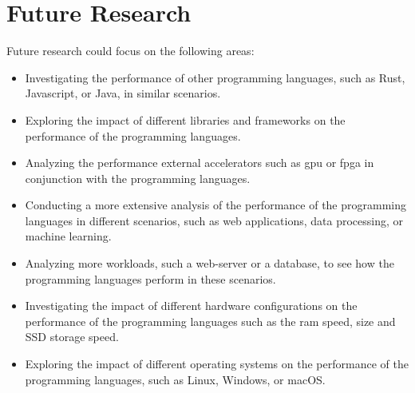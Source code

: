 \section{Future Research}
Future research could focus on the following areas:
\begin{itemize}
    \item Investigating the performance of other programming languages, such as Rust, Javascript, or Java, in similar scenarios.
    \item Exploring the impact of different libraries and frameworks on the performance of the programming languages.
    \item Analyzing the performance external accelerators such as \gls{gpu} or \gls{fpga} in conjunction with the programming languages.
    \item Conducting a more extensive analysis of the performance of the programming languages in different scenarios, such as web applications, data processing, or machine learning.
    \item Analyzing more workloads, such a web-server or a database, to see how the programming languages perform in these scenarios.
    \item Investigating the impact of different hardware configurations on the performance of the programming languages such as the \gls{ram} speed, size and SSD storage speed.
    \item Exploring the impact of different operating systems on the performance of the programming languages, such as Linux, Windows, or macOS.
\end{itemize}
